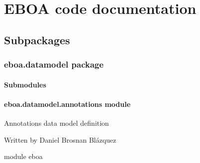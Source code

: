 \chapter{EBOA code documentation}
\section{Subpackages}
\label{\detokenize{eboa:subpackages}}

\subsection{eboa.datamodel package}
\label{\detokenize{eboa.datamodel:eboa-datamodel-package}}\label{\detokenize{eboa.datamodel::doc}}

\subsubsection{Submodules}
\label{\detokenize{eboa.datamodel:submodules}}

\subsubsection{eboa.datamodel.annotations module}
\label{\detokenize{eboa.datamodel:module-eboa.datamodel.annotations}}\label{\detokenize{eboa.datamodel:eboa-datamodel-annotations-module}}
Annotations data model definition

Written by Daniel Brosnan Blázquez

module eboa


